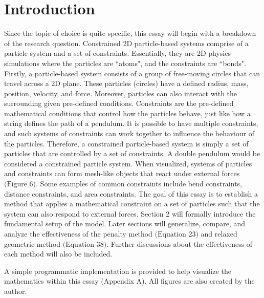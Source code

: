 \documentclass[12pt, letterpaper]{article}
\begin{document}
\section{Introduction}
\hspace{\parindent} Since the topic of choice is quite specific, this essay will begin with a breakdown of the research question. Constrained 2D particle-based systems comprise of a particle system and a set of constraints. Essentially, they are 2D physics simulations where the particles are ``atoms", and the constraints are ``bonds". Firstly, a particle-based system consists of a group of free-moving circles that can travel across a 2D plane. These particles (circles) have a defined radius, mass, position, velocity, and force. Moreover, particles can also interact with the surrounding given pre-defined conditions. Constraints are the pre-defined mathematical conditions that control how the particles behave, just like how a string defines the path of a pendulum. It is possible to have multiple constraints, and such systems of constraints can work together to influence the behaviour of the particles. Therefore, a constrained particle-based system is simply a set of particles that are controlled by a set of constraints. A double pendulum would be considered a constrained particle system. When visualized, systems of particles and constraints can form mesh-like objects that react under external forces $\text{(Figure 6)}$. Some examples of common constraints include bend constraints, distance constraints, and area constraints. The goal of this essay is to establish a method that applies a mathematical constraint on a set of particles such that the system can also respond to external forces. Section 2 will formally introduce the fundamental setup of the model. Later sections will generalize, compare, and analyze the effectiveness of the penalty method $\text{(Equation 23)}$ and relaxed geometric method $\text{(Equation 38)}$. Further discussions about the effectiveness of each method will also be included.

A simple programmatic implementation is provided to help visualize the mathematics within this essay ($\text{Appendix A}$). All figures are also created by the author.
\end{document}
